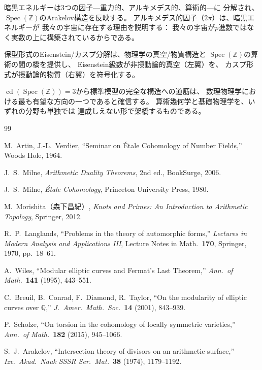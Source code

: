 \documentclass[12pt,a4paper]{article}
\theoremstyle{definition}
\newcommand{\Spec}{\operatorname{Spec}}
\newcommand{\cd}{\operatorname{cd}}
\newcommand{\Q}{\mathbb{Q}}
\newcommand{\Z}{\mathbb{Z}}
\begin{document}
暗黒エネルギーは3つの因子---重力的、アルキメデス的、算術的---に
分解され、$\Spec(\Z)$のArakelov構造を反映する。
アルキメデス的因子（$2\pi$）は、暗黒エネルギーが
我々の宇宙に存在する理由を説明する：
我々の宇宙が$p$進数ではなく実数の上に構築されているからである。

保型形式のEisenstein/カスプ分解は、物理学の真空/物質構造と
$\Spec(\Z)$の算術の間の橋を提供し、
Eisenstein級数が非摂動論的真空（左翼）を、
カスプ形式が摂動論的物質（右翼）を符号化する。

$\cd(\Spec(\Z))=3$から標準模型の完全な構造への道筋は、
数理物理学における最も有望な方向の一つであると確信する。
算術幾何学と基礎物理学を、いずれの分野も単独では
達成しえない形で架橋するものである。

\begin{thebibliography}{99}

M.~Artin, J.-L.~Verdier,
``Seminar on \'Etale Cohomology of Number Fields,''
Woods Hole, 1964.

J.~S.~Milne,
\textit{Arithmetic Duality Theorems}, 2nd ed.,
BookSurge, 2006.

J.~S.~Milne,
\textit{\'Etale Cohomology},
Princeton University Press, 1980.

M.~Morishita（森下昌紀）,
\textit{Knots and Primes: An Introduction to Arithmetic Topology},
Springer, 2012.

R.~P.~Langlands,
``Problems in the theory of automorphic forms,''
\textit{Lectures in Modern Analysis and Applications III},
Lecture Notes in Math.\ \textbf{170}, Springer, 1970, pp.~18--61.

A.~Wiles,
``Modular elliptic curves and Fermat's Last Theorem,''
\textit{Ann.\ of Math.}\ \textbf{141} (1995), 443--551.

C.~Breuil, B.~Conrad, F.~Diamond, R.~Taylor,
``On the modularity of elliptic curves over $\Q$,''
\textit{J.\ Amer.\ Math.\ Soc.}\ \textbf{14} (2001), 843--939.

P.~Scholze,
``On torsion in the cohomology of locally symmetric varieties,''
\textit{Ann.\ of Math.}\ \textbf{182} (2015), 945--1066.

S.~J.~Arakelov,
``Intersection theory of divisors on an arithmetic surface,''
\textit{Izv.\ Akad.\ Nauk SSSR Ser.\ Mat.}\ \textbf{38} (1974), 1179--1192.


\end{thebibliography}
\end{document}
